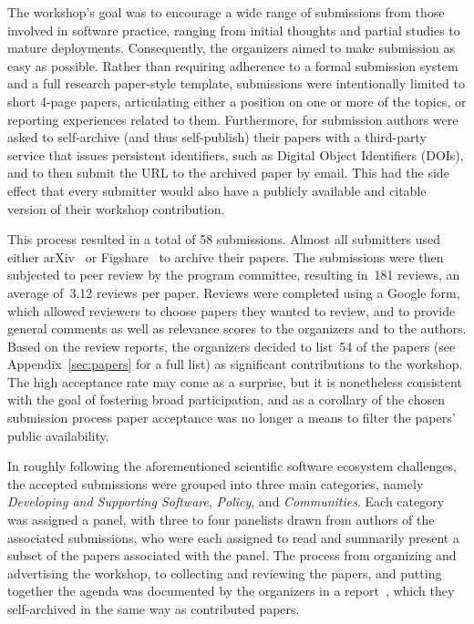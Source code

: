 \documentclass[11pt, oneside]{amsart}
\begin{document}
The workshop's goal was to encourage a wide range of submissions from
those involved in software practice, ranging from initial thoughts and
partial studies to mature deployments. Consequently, the organizers
aimed to make submission as easy as possible. Rather than requiring
adherence to a formal submission system and a full research
paper-style template, submissions were intentionally limited to short
4-page papers, articulating either a position on one or more of the
topics, or reporting experiences related to them. Furthermore, for
submission authors were asked to self-archive (and thus self-publish)
their papers with a third-party service that issues persistent
identifiers, such as Digital Object Identifiers (DOIs), and to then
submit the URL to the archived paper by email. This had the side
effect that every submitter would also have a publicly available and
citable version of their workshop contribution. 

This process resulted in a total of 58 submissions. Almost all submitters used either
arXiv~\cite{arXiv-web} or Figshare~\cite{figshare-web} to archive
their papers. The submissions were then subjected to peer review by
the program committee, resulting in~181 reviews, an average of~3.12 reviews per
paper. Reviews were completed using a Google form, which allowed
reviewers to choose papers they wanted to review, and to provide
general comments as well as relevance scores to the organizers and
to the authors. Based on the review reports, the organizers decided to
list~54 of the papers (see Appendix~\ref{sec:papers} for a full list) as significant
contributions to the workshop. The high acceptance rate may come as a
surprise, but it is nonetheless consistent with the goal of
fostering broad participation, and as a corollary of the chosen submission
process paper acceptance was no longer a means to filter
the papers' public availability. 

In roughly following the aforementioned scientific software ecosystem
challenges, the accepted submissions were
grouped into three main categories, namely \emph{Developing and
Supporting Software}, \emph{Policy}, and \emph{Communities}. Each
category was assigned a panel, with three to four panelists 
drawn from authors of the associated submissions, who were each
assigned to read and summarily present a subset of
the papers associated with the panel. The process from organizing and
advertising the workshop, to collecting and reviewing the
papers, and putting together the agenda was documented by the
organizers in a report~\cite{WSSSPE1-pre-report}, which they
self-archived in the same way as contributed papers.
\end{document}

